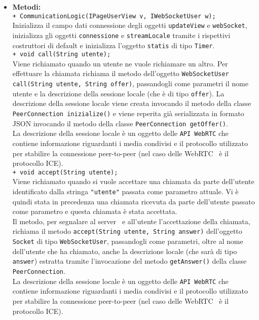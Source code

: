 {{\begin{sloppypar}
{{{\begin{itemize}
					\texttt{- Timer stats}: riferimento ad un oggetto di tipo \texttt{Timer} che serve a campionare le statistiche in maniera ripetuta e di inviarle all'interfaccia grafica.\\

				\item[] \textbf{Metodi:}{\\
					\texttt{+ CommunicationLogic(IPageUserView v, IWebSocketUser w);}\\
					Inizializza il campo dati connessione degli oggetti \texttt{updateView} e \texttt{webSocket}, inizializza gli oggetti \texttt{connessione} e \texttt{streamLocale} tramite i rispettivi costruttori di default e inizializza l'oggetto \texttt{statis} di tipo \texttt{Timer}.\\

					\texttt{+ void call(String utente);}\\
					Viene richiamato quando un utente ne vuole richiamare un altro. Per effettuare la chiamata richiama il metodo dell'oggetto \texttt{WebSocketUser call(String utente, String offer)}, passandogli come parametri il nome utente e la descrizione della sessione locale (che è di tipo \texttt{offer}). La descrizione della sessione locale viene creata invocando il metodo della classe \texttt{PeerConnection inizialize()} e viene reperita già serializzata in formato JSON invocando il metodo della classe \texttt{PeerConnection getOffer()}.\\
 La descrizione della sessione locale è un oggetto delle \texttt{API WebRTC} che contiene informazione riguardanti i media condivisi e il protocollo utilizzato per stabilire la connessione peer-to-peer (nel caso delle WebRTC\g~ è il protocollo ICE).\\
 
					\texttt{+ void accept(String utente);}\\
					Viene richiamato quando si vuole accettare una chiamata da parte dell'utente identificato dalla stringa \texttt{"utente"} passata come parametro attuale. Vi è quindi stata in precedenza una chiamata ricevuta da parte dell'utente passato come parametro e questa chiamata è stata accettata.\\
					Il metodo, per segnalare al server\g~ e all'utente l'accettazione della chiamata, richiama il metodo \texttt{accept(String utente, String answer)} dell'oggetto \texttt{Socket} di tipo \texttt{WebSocketUser}, passandogli come parametri, oltre al nome dell'utente che ha chiamato, anche la descrizione locale (che sarà di tipo \texttt{answer}) estratta tramite l'invocazione del metodo \texttt{getAnswer()} della classe \texttt{PeerConnection}.\\
					La descrizione della sessione locale è un oggetto delle \texttt{API WebRTC} che contiene informazione riguardanti i media condivisi e il protocollo utilizzato per stabilire la connessione peer-to-peer (nel caso delle WebRTC\g~ è il protocollo ICE).\\

}
\end{itemize}}}}
\end{sloppypar}}}
